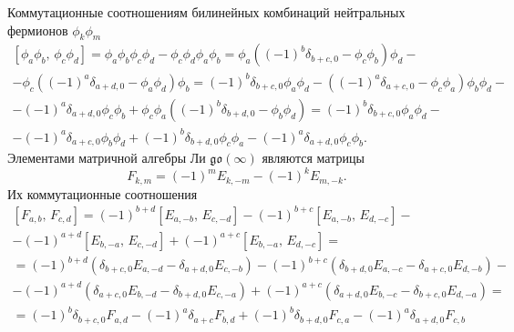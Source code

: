 \documentclass[a5paper,twoside]{article}
\begin{document}
Коммутационные соотношениям
билинейных комбинаций нейтральных фермионов $\phi_k \phi_m$
\begin{multline}
\left[ \phi_{a}\phi_b,\,\phi_{c}\phi_d \right] =
\phi_a \phi_b \phi_c \phi_d -\phi_c \phi_d \phi_a \phi_b=
\phi_a \left( \left( -1 \right) ^b \delta_{b+c,0}-\phi_c \phi_b
 \right) 	\phi_d-\\-
 \phi_c \left( \left( -1 \right) ^a \delta_{a+d,0}-\phi_a \phi_d \right) \phi_b=
\left( -1 \right) ^b \delta_{b+c,0} \phi_a \phi_d-
(\left( -1 \right)^a \delta_{a+c,0}- \phi_c \phi_a) \phi_b \phi_d-\\-\left( -1 \right) ^a
\delta_{a+d,0} \phi_c \phi_b+\phi_c \phi_a \left(\left( -1 \right) ^b \delta_{b+d,0}-\phi_b \phi_d
\right) =\left( -1 \right) ^b \delta_{b+c,0} \phi_a \phi_d-\\-
\left( -1 \right)^a \delta_{a+c,0} \phi_b \phi_d+ \left( -1 \right) ^b \delta_{b+d,0} \phi_c \phi_a-\left( -1 \right) ^a
\delta_{a+d,0} \phi_c \phi_b
.\end{multline} 
Элементами матричной алгебры Ли $\mathfrak{go}(\infty)$
являются матрицы
\begin{equation}
	F_{k,m}=(-1)^m E_{k,-m}-(-1)^k E_{m,-k}
.\end{equation} 
Их коммутационные соотношения
\begin{multline}
	\left[ F_{a,b},\,F_{c,d} \right] =(-1)^{b+d}\left[ E_{a,-b},\, E_{c,-d} \right] -(-1)^{b+c} \left[ 
	E_{a,-b},\,E_{d,-c}\right] -\\-\left( -1 \right) ^{
a+d}\left[ E_{b,-a},\,E_{c,-d} \right] +
\left( -1 \right) ^{a+c}\left[ E_{b,-a},\,E_{d,-c} \right] =
\\=(-1)^{b+d}\left( \delta_{b+c,0} E_{a,-d}-
\delta_{a+d,0} E_{c,-b}\right) -
\left( -1 \right) ^{b+c}\left( \delta_{b+d,0}E_{a,-c}-
\delta_{a+c,0}E_{d,-b}\right)-\\-
\left( -1 \right) ^{a+d} \left( \delta_{a+c,0} E_{b,-d}
-\delta_{b+d,0}E_{c,-a}\right) +\left( -1 \right) ^{a+c}
\left( \delta_{a+d,0} E_{b,-c} -\delta_{b+c,0} E_{d,-a} \right) =\\=
(-1)^b \delta_{b+c,0} F_{a,d}-(-1)^a \delta_{a+c}F_{b,d}+
\left( -1 \right) ^b\delta_{b+d,0} F_{c,a}-\left( -1 \right) ^a \delta_{a+d,0} F_{c,b}
\end{multline} 
\end{document}
